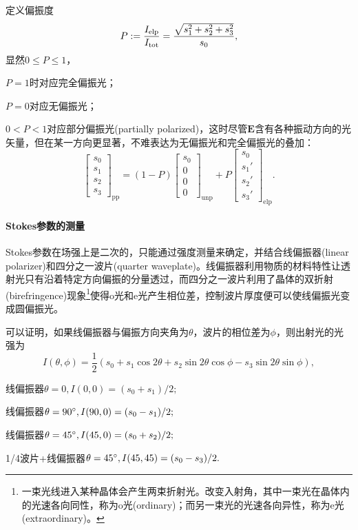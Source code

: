 定义偏振度
\[
    P:=\frac{I_\text{elp}}{I_\mathrm{tot}}=\frac{\sqrt{s_1^2+s_2^2+s_3^2}}{s_0},
\]
显然$0\leqslant P\leqslant 1$，
\begin{compactitem}
	\item $P=1$时对应完全偏振光；
	\item $P=0$对应无偏振光；
	\item $0<P<1$对应部分偏振光(partially polarized)，这时尽管$\bm E$含有各种振动方向的光矢量，但在某一方向更显著，不难表达为无偏振光和完全偏振光的叠加：
    \[
        \begin{bmatrix}
            s_0\\s_1\\s_2\\s_3
        \end{bmatrix}_\text{pp}=(1-P)
        \begin{bmatrix}
            s_0\\0\\0\\0
        \end{bmatrix}_\text{unp}+P
        \begin{bmatrix}
            s_0\\s_1'\\s_2'\\s_3'
        \end{bmatrix}_\text{elp}.
    \]
\end{compactitem}
\paragraph{Stokes参数的测量}
Stokes参数在场强上是二次的，只能通过强度测量来确定，并结合线偏振器(linear polarizer)和四分之一波片(quarter waveplate)。线偏振器利用物质的材料特性让透射光只有沿着特定方向偏振的分量透过，而四分之一波片利用了晶体的双折射(birefringence)现象\footnote{一束光线进入某种晶体会产生两束折射光。改变入射角，其中一束光在晶体内的光速各向同性，称为o光(ordinary)；而另一束光的光速各向异性，称为e光(extraordinary)。}使得o光和e光产生相位差，控制波片厚度便可以使线偏振光变成圆偏振光。

可以证明，如果线偏振器与偏振方向夹角为$\theta$，波片的相位差为$\phi$，则出射光的光强为
\[
    I(\theta,\phi)=\frac12(s_0+s_1\cos2\theta+s_2\sin2\theta\cos\phi-s_3\sin2\theta\sin\phi),
\]
\begin{compactitem}
	\item 线偏振器$\theta=0,I(0,0)=(s_0+s_1)/2;$
    \item 线偏振器$\theta=90^\circ,I(90,0)=(s_0-s_1)/2;$
    \item 线偏振器$\theta=45^\circ,I(45,0)=(s_0+s_2)/2;$
    \item 1/4波片+线偏振器$\theta=45^\circ,I(45,45)=(s_0-s_3)/2.$
\end{compactitem}

